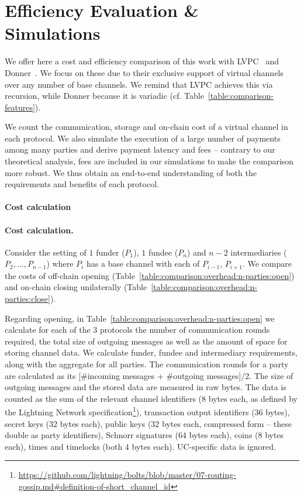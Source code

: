 \section{Efficiency Evaluation \& Simulations}
  \label{section:comparison}
  We offer here a cost and efficiency comparison of this work with
  LVPC~\cite{10.1007/978-3-030-65411-5_18} and Donner~\cite{donner}. We focus on
  these due to their exclusive support of
  virtual channels over any number of base channels. We remind that LVPC
  achieves this via recursion, while Donner
  because it is variadic (cf. Table~\ref{table:comparison-features}).

  We count the communication, storage and on-chain cost of a virtual
  channel in each protocol. We also simulate the execution of a large number
  of payments among many parties and derive payment latency and fees -- contrary
  to our theoretical analysis, fees are included in our simulations to make the
  comparison more robust. We thus
  obtain an end-to-end understanding of both the requirements and benefits
  of each protocol.

  \makeatletter%
    {\paragraph{Cost calculation}}%
    {\paragraph{Cost calculation.}}%
  \makeatother%
  Consider the setting of $1$
  funder ($P_1$), $1$ fundee ($P_n$) and $n-2$ intermediaries ($P_2, \dots,
  P_{n-1}$) where $P_i$ has a base channel with each of $P_{i-1}$,
  $P_{i+1}$. We compare the costs of off-chain opening
  (Table~\ref{table:comparison:overhead:n-parties:open}) and on-chain
  closing unilaterally
  (Table~\ref{table:comparison:overhead:n-parties:close}).

  Regarding opening, in
  Table~\ref{table:comparison:overhead:n-parties:open} we calculate for each of
  the $3$ protocols the number of communication rounds required, the total
  size of outgoing messages as well as the amount of space for storing
  channel data. We calculate funder, fundee
  and intermediary requirements, along with the aggregate for all parties.
  The communication rounds for a party are calculated as its [\#incoming
  messages + \#outgoing messages]/2. The size of outgoing messages and the
  stored data are measured in raw bytes. The data is counted as the sum of the
  relevant channel identifiers ($8$ bytes each, as defined by the Lightning
  Network
  specification\footnote{\url{https://github.com/lightning/bolts/blob/master/07-routing-gossip.md\#definition-of-short_channel_id}}),
  transaction output identifiers ($36$ bytes), secret keys ($32$ bytes each),
  public keys ($32$ bytes each, compressed form -- these double as party
  identifiers), Schnorr signatures ($64$ bytes each), coins ($8$ bytes each),
  times and timelocks (both $4$ bytes each). UC-specific data is ignored.

